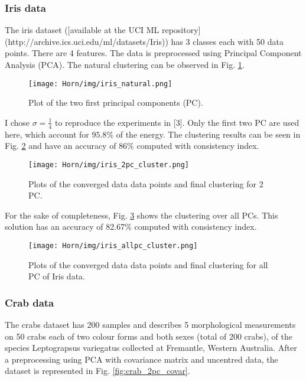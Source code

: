 
\subsubsection{Iris data}
\label{sec:horn_iris}
The iris dataset ([available at the UCI ML repository](http://archive.ics.uci.edu/ml/datasets/Iris)) has 3 classes each with 50 data points. There are 4 features. The data is preprocessed using Principal Component Analysis (PCA). The natural clustering can be observed in Fig. \ref{fig:iris_natural}. 


\begin{figure}[hbtp]
\centering
\texttt{[image: Horn/img/iris\_natural.png]}
\caption{Plot of the two first principal components (PC).}
\label{fig:iris_natural}

\end{figure}

I chose $\sigma=\frac{1}{4}$ to reproduce the experiments in [3]. Only the first two PC are used here, which account for $95.8\%$ of the energy. The clustering results can be seen in Fig. \ref{fig:iris_2pc_cluster} and have an accuracy of 86\% computed with consistency index.


\begin{figure}[hbtp]
\centering
\texttt{[image: Horn/img/iris\_2pc\_cluster.png]}
\caption{Plots of the converged data data points and final clustering for 2 PC.}
\label{fig:iris_2pc_cluster}

\end{figure}

For the sake of completeness, Fig. \ref{fig:iris_allpc_cluster} shows the clustering over all PCs. This solution has an accuracy of 82.67\% computed with consistency index.


\begin{figure}[hbtp]
\centering
\texttt{[image: Horn/img/iris\_allpc\_cluster.png]}
\caption{Plots of the converged data data points and final clustering for all PC of Iris data.}
\label{fig:iris_allpc_cluster}
\end{figure}


\subsubsection{Crab data}


The crabs dataset has 200 samples and describes 5 morphological measurements on 50 crabs each of two colour forms and both sexes (total of 200 crabs), of the species Leptograpsus variegatus collected at Fremantle, Western Australia. After a preprocessing using PCA with covariance matrix and uncentred data, the dataset is represented in Fig. \ref{fig:crab_2pc_covar}.%

